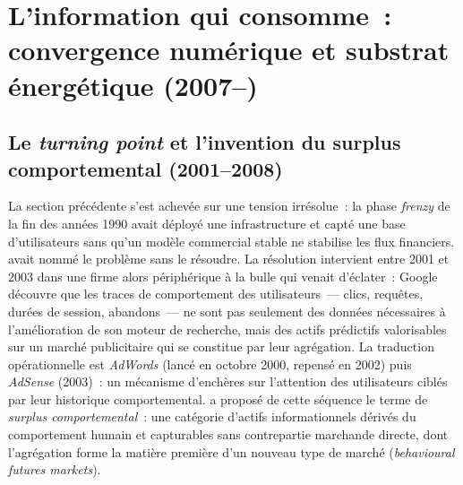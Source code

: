 \section{L'information qui consomme~: convergence numérique et substrat énergétique (2007--)}\label{sec:contemporain}

\subsection{Le \emph{turning point} et l'invention du surplus comportemental (2001--2008)}\label{subsec:turning_point}

%
La section précédente s'est achevée sur une tension irrésolue~: la phase \emph{frenzy} de la fin des années 1990 avait déployé une infrastructure et capté une base d'utilisateurs sans qu'un modèle commercial stable ne stabilise les flux financiers. \textcite{goldhaber_attention_1997} avait nommé le problème sans le résoudre. La résolution intervient entre 2001 et 2003 dans une firme alors périphérique à la bulle qui venait d'éclater~: Google découvre que les traces de comportement des utilisateurs~--- clics, requêtes, durées de session, abandons~--- ne sont pas seulement des données nécessaires à l'amélioration de son moteur de recherche, mais des actifs prédictifs valorisables sur un marché publicitaire qui se constitue par leur agrégation. La traduction opérationnelle est \emph{AdWords} (lancé en octobre 2000, repensé en 2002) puis \emph{AdSense} (2003)~: un mécanisme d'enchères sur l'attention des utilisateurs ciblés par leur historique comportemental. \textcite{zuboff_surveillance_2019} a proposé de cette séquence le terme de \emph{surplus comportemental}~: une catégorie d'actifs informationnels dérivés du comportement humain et capturables sans contrepartie marchande directe, dont l'agrégation forme la matière première d'un nouveau type de marché (\emph{behavioural futures markets}).

